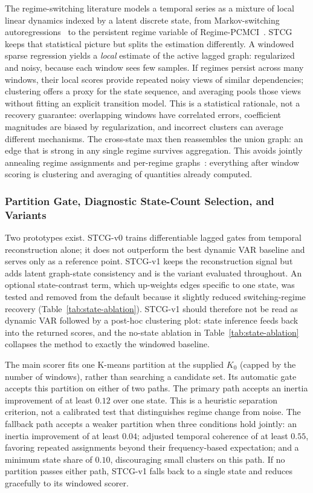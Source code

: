 \documentclass[sigconf,anonymous]{acmart}
\begin{document}
The regime-switching literature models a temporal series as a mixture of local linear dynamics indexed by a latent discrete state, from Markov-switching autoregressions~\cite{hamilton1989new} to the persistent regime variable of Regime-PCMCI~\cite{saggioro2020regime}.
STCG keeps that statistical picture but splits the estimation differently.
A windowed sparse regression yields a \emph{local} estimate of the active lagged graph: regularized and noisy, because each window sees few samples.
If regimes persist across many windows, their local scores provide repeated noisy views of similar dependencies; clustering offers a proxy for the state sequence, and averaging pools those views without fitting an explicit transition model.
This is a statistical rationale, not a recovery guarantee: overlapping windows have correlated errors, coefficient magnitudes are biased by regularization, and incorrect clusters can average different mechanisms.
The cross-state max then reassembles the union graph: an edge that is strong in any single regime survives aggregation.
This avoids jointly annealing regime assignments and per-regime graphs~\cite{saggioro2020regime}: everything after window scoring is clustering and averaging of quantities already computed.

\subsubsection{Partition Gate, Diagnostic State-Count Selection, and Variants}
\label{sec:method-variants}

Two prototypes exist.
STCG-v0 trains differentiable lagged gates from temporal reconstruction alone; it does not outperform the best dynamic VAR baseline and serves only as a reference point.
STCG-v1 keeps the reconstruction signal but adds latent graph-state consistency and is the variant evaluated throughout.
An optional state-contrast term, which up-weights edges specific to one state, was tested and removed from the default because it slightly reduced switching-regime recovery (Table~\ref{tab:state-ablation}).
STCG-v1 should therefore not be read as dynamic VAR followed by a post-hoc clustering plot: state inference feeds back into the returned scores, and the no-state ablation in Table~\ref{tab:state-ablation} collapses the method to exactly the windowed baseline.

The main scorer fits one K-means partition at the supplied $K_0$ (capped by the number of windows), rather than searching a candidate set. Its automatic gate accepts this partition on either of two paths.
The primary path accepts an inertia improvement of at least $0.12$ over one state. This is a heuristic separation criterion, not a calibrated test that distinguishes regime change from noise.
The fallback path accepts a weaker partition when three conditions hold jointly: an inertia improvement of at least $0.04$; adjusted temporal coherence of at least $0.55$, favoring repeated assignments beyond their frequency-based expectation; and a minimum state share of $0.10$, discouraging small clusters on this path.
If no partition passes either path, STCG-v1 falls back to a single state and reduces gracefully to its windowed scorer.
\end{document}
